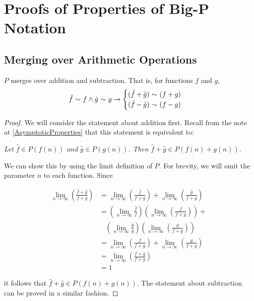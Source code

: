 \appendix
\appendixpage

\section{Proofs of Properties of Big-P Notation}

\subsection{Merging over Arithmetic Operations}
\label{MergingOverArithmetic}

\begin{theorem}
	$P$ merges over addition and subtraction. That is, for functions $f$ and $g$,
	\begin{align*}
	\hat{f} \ \mathtt{\sim}\  f \land \hat{g} \ \mathtt{\sim}\  g \rightarrow \begin{cases}
	(\hat{f} + \hat{g}) \ \mathtt{\sim}\  (f + g)\\
	(\hat{f} - \hat{g}) \ \mathtt{\sim}\  (f - g)
	\end{cases}
	\end{align*}
\end{theorem}

\begin{proof}
	We will consider the statement about addition first. Recall from the note at \ref{AsymptoticProperties} that this statement is equivalent to:
	
	\textit{Let $\hat{f} \in P(f(n))$ and $\hat{g} \in P(g(n))$. Then $\hat{f} + \hat{g} \in P(f(n) + g(n))$.}
	
	We can show this by using the limit definition of $P$. For brevity, we will omit the parameter $n$ to each function. Since
	
	\begin{align*}
	\lim_{n \to \infty} \left( \frac{\hat{f} + \hat{g}}{f + g} \right) &= \lim_{n \to \infty} \left( \frac{\hat{f}}{f + g} \right) + \lim_{n \to \infty} \left( \frac{\hat{g}}{f + g} \right)\\
	&= \left( \lim_{n \to \infty} \frac{\hat{f}}{f} \right) \left( \lim_{n \to \infty} \left( \frac{f}{f + g} \right) \right) +\\
	&\ \ \ \ \left( \lim_{n \to \infty} \frac{\hat{g}}{g} \right) \left( \lim_{n \to \infty} \left( \frac{g}{f + g} \right) \right)\\
	&= \lim_{n \to \infty} \left( \frac{f}{f + g} \right) + \lim_{n \to \infty} \left( \frac{g}{f + g} \right)\\
	&= \lim_{n \to \infty} \left( \frac{f + g}{f + g} \right)\\
	&= 1
	\end{align*}
	
	it follows that $\hat{f} + \hat{g} \in P(f(n) + g(n))$. The statement about subtraction can be proved in a similar fashion.
\end{proof}

